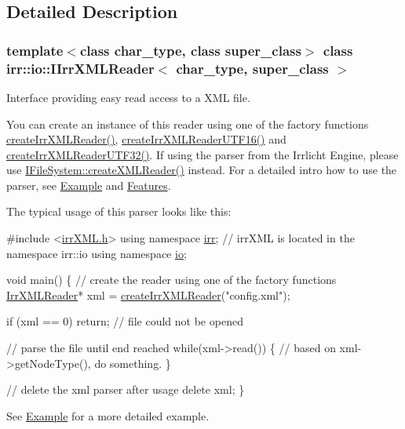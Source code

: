 \subsection{Detailed Description}
\subsubsection*{template$<$class char\+\_\+type, class super\+\_\+class$>$\newline
class irr\+::io\+::\+I\+Irr\+X\+M\+L\+Reader$<$ char\+\_\+type, super\+\_\+class $>$}

Interface providing easy read access to a X\+ML file. 

You can create an instance of this reader using one of the factory functions \hyperlink{namespaceirr_1_1io_a581f4d4648398759c61266d63d7106b1}{create\+Irr\+X\+M\+L\+Reader()}, \hyperlink{namespaceirr_1_1io_a86473ef152c15b685af181a4c5461a5d}{create\+Irr\+X\+M\+L\+Reader\+U\+T\+F16()} and \hyperlink{namespaceirr_1_1io_ae05bf7ee342431ea8c98fb98e75b974a}{create\+Irr\+X\+M\+L\+Reader\+U\+T\+F32()}. If using the parser from the Irrlicht Engine, please use \hyperlink{classirr_1_1io_1_1IFileSystem_a167c9fa159d16ee5c56c074636b0865e}{I\+File\+System\+::create\+X\+M\+L\+Reader()} instead. For a detailed intro how to use the parser, see \hyperlink{irrXML.h_irrxmlexample}{Example} and \hyperlink{irrXML.h_features}{Features}.

The typical usage of this parser looks like this\+: 
\begin{DoxyCode}
\textcolor{preprocessor}{#include <\hyperlink{irrXML_8h}{irrXML.h}>}
\textcolor{keyword}{using namespace }\hyperlink{namespaceirr}{irr}; \textcolor{comment}{// irrXML is located in the namespace irr::io}
\textcolor{keyword}{using namespace }\hyperlink{namespaceio}{io};

\textcolor{keywordtype}{void} main()
\{
    \textcolor{comment}{// create the reader using one of the factory functions}
    \hyperlink{namespaceirr_1_1io_a1628edbb9d5d53f18c82d2a92b0ad27e}{IrrXMLReader}* xml = \hyperlink{namespaceirr_1_1io_a581f4d4648398759c61266d63d7106b1}{createIrrXMLReader}(\textcolor{stringliteral}{"config.xml"});

    \textcolor{keywordflow}{if} (xml == 0)
        \textcolor{keywordflow}{return}; \textcolor{comment}{// file could not be opened}

    \textcolor{comment}{// parse the file until end reached}
    \textcolor{keywordflow}{while}(xml->read())
    \{
        \textcolor{comment}{// based on xml->getNodeType(), do something.}
    \}

    \textcolor{comment}{// delete the xml parser after usage}
    \textcolor{keyword}{delete} xml;
\}
\end{DoxyCode}
 See \hyperlink{irrXML.h_irrxmlexample}{Example} for a more detailed example. 

